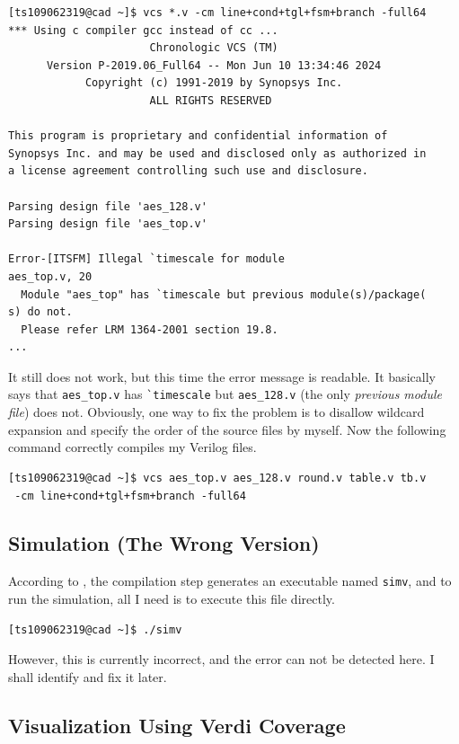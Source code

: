 \documentclass{article}
\begin{document}
\begin{verbatim}
[ts109062319@cad ~]$ vcs *.v -cm line+cond+tgl+fsm+branch -full64
*** Using c compiler gcc instead of cc ...
                      Chronologic VCS (TM)
      Version P-2019.06_Full64 -- Mon Jun 10 13:34:46 2024
            Copyright (c) 1991-2019 by Synopsys Inc.
                      ALL RIGHTS RESERVED

This program is proprietary and confidential information of
Synopsys Inc. and may be used and disclosed only as authorized in
a license agreement controlling such use and disclosure.

Parsing design file 'aes_128.v'
Parsing design file 'aes_top.v'

Error-[ITSFM] Illegal `timescale for module
aes_top.v, 20
  Module "aes_top" has `timescale but previous module(s)/package(
s) do not.
  Please refer LRM 1364-2001 section 19.8.
...
\end{verbatim}

It still does not work, but this time the error message is readable. It basically says that \verb|aes_top.v| has \verb|`timescale| but \verb|aes_128.v| (the only \textit{previous module file}) does not. Obviously, one way to fix the problem is to disallow wildcard expansion and specify the order of the source files by myself. Now the following command correctly compiles my Verilog files.

\begin{verbatim}
[ts109062319@cad ~]$ vcs aes_top.v aes_128.v round.v table.v tb.v
 -cm line+cond+tgl+fsm+branch -full64
\end{verbatim}

\subsection{Simulation (The Wrong Version)}

According to \cite{ytverdiprep}, the compilation step generates an executable named \verb|simv|, and to run the simulation, all I need is to execute this file directly.

\begin{verbatim}
[ts109062319@cad ~]$ ./simv
\end{verbatim}

However, this is currently incorrect, and the error can not be detected here. I shall identify and fix it later.

\subsection{Visualization Using Verdi Coverage}
\end{document}
